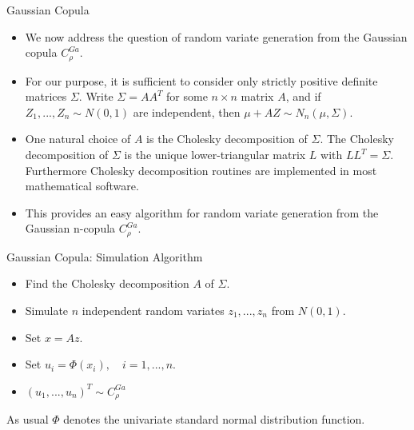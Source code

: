 \documentclass[11pt]{beamer}
\theoremstyle{plain}
\theoremstyle{definition}
\theoremstyle{remark}
\begin{document}
\begin{frame}{Gaussian Copula}
   \begin{itemize}
      \item We now address the question of random variate generation from the Gaussian copula $C_\rho^{Ga} $.
      \item For our purpose, it is sufficient to consider only strictly positive definite matrices $\Sigma$. Write $\Sigma = AA^T$ for some $n 
      \times n$ matrix $A$, and if $Z_1,...,Z_n \sim N(0,1)$ are independent, then $\mu + AZ \sim 
	  N_n(\mu, \Sigma)$.
	 \item One natural choice of $A$ is the Cholesky decomposition of $\Sigma$. The Cholesky decomposition of $\Sigma$ is the unique 
	 lower-triangular matrix $L$ with $LL^T = \Sigma$. Furthermore Cholesky decomposition routines are implemented in most mathematical 
	 software. 
	 \item This provides an easy algorithm for random variate generation from the Gaussian n-copula $C_\rho^{Ga}$.
   \end{itemize}
\end{frame}
%
\begin{frame}{Gaussian Copula: Simulation Algorithm}
   \begin{itemize}
		\item  Find the Cholesky decomposition $A$ of $\Sigma$.
		\item  Simulate $n$ independent random variates $z_1, . . . , z_n$ from $N (0, 1)$.
		\item  Set $x=Az$.
		\item  Set $u_i = \Phi(x_i), \quad i = 1,...,n$.
		\item  $(u_1,...,u_n)^T\sim C_\rho^{Ga}$
	\end{itemize}
	\vspace{2em}
	As usual $\Phi$ denotes the univariate standard normal distribution function.
\end{frame}
%
\end{document}
